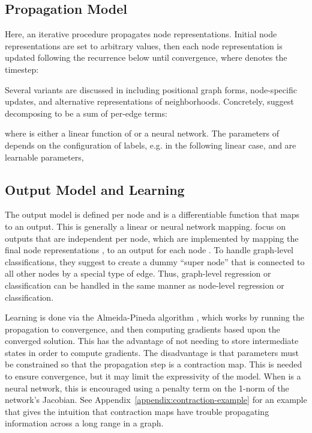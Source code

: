 \documentclass{article} \usepackage{iclr2016_conference,times}
\begin{document}
\subsection{Propagation Model}
Here, an iterative procedure propagates node representations.
Initial node representations  are set to arbitrary values,
then each node representation is updated following the recurrence below until
convergence, where  denotes the timestep:

Several variants are discussed in \cite{scarselli2009graph}
including positional graph forms, node-specific updates, and
alternative representations of neighborhoods. Concretely,
\cite{scarselli2009graph} suggest decomposing  to be
a sum of per-edge terms:

where  is either a linear function of 
or a neural network. The parameters of  depends on the configuration of
labels, e.g. in the following linear case,  and  are learnable
parameters,


\subsection{Output Model and Learning}
The output model is defined per node and is a differentiable function 
 that maps to an output. This is
generally a linear or neural network mapping.
\cite{scarselli2009graph} focus on
outputs that are independent per node, which are implemented by
mapping the final node representations , to an
output  for each node . To handle graph-level classifications, they suggest to
create a dummy ``super node'' that is connected to all other nodes by
a special type of edge. Thus, graph-level regression or classification
can be handled in the same manner as node-level regression or
classification.

Learning is done via the Almeida-Pineda algorithm
\citep{almeida1990learning,pineda1987generalization}, which works by
running the propagation to convergence, and then computing gradients
based upon the converged solution. This has the
advantage of not needing to store intermediate states in order to
compute gradients. The disadvantage is that 
parameters must be constrained so that
the propagation step is a contraction map. This is needed to ensure
convergence, but it may limit the expressivity of the model.
When  is a neural
network, this is encouraged using a penalty term on the 1-norm
of the network's Jacobian.
See Appendix~\ref{appendix:contraction-example} for an
example that gives the intuition that contraction maps have trouble
propagating information across a long range in a graph.
\end{document}
